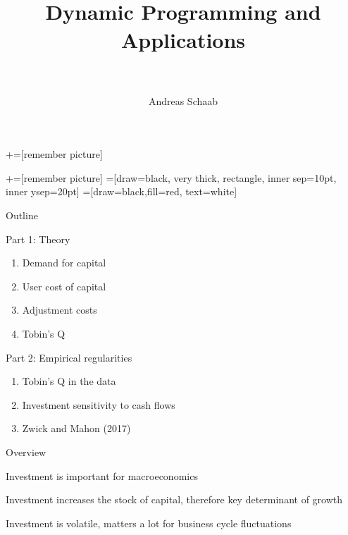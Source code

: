 \documentclass[11pt, aspectratio=169]{beamer}
\title[]{\\[8pt]
	{\large \color{blue} Dynamic Programming and Applications \\[5pt] \normalfont{Investment} \\[10pt] \normalfont{Lecture 9}}}
\author[Schaab]{Andreas Schaab}
\institute{}
\date{}
\newenvironment{witemize}{\itemize\addtolength{\itemsep}{10pt}}{\enditemize}
\begin{document}
+=[remember picture]

\newcommand\marktopleft[1]{%
	\tikz[overlay,remember picture] 
	\node (marker-#1-a) at (-.3em,.3em) {};%
}
\newcommand\markbottomright[2]{%
	\tikz[overlay,remember picture] 
	\node (marker-#1-b) at (0em,0em) {};%
}
+=[remember picture] 
 =[draw=black, very thick, rectangle, inner sep=10pt, inner ysep=20pt]
 =[draw=black,fill=red, text=white]


\addtocounter{framenumber}{-1}
\thispagestyle{empty}
\maketitle 
\newpage




\begin{frame}{Outline}
\thispagestyle{empty}
\addtocounter{framenumber}{-1}

Part 1: Theory
\begin{enumerate}
\item Demand for capital

\item User cost of capital

\item Adjustment costs

\item Tobin's Q
\end{enumerate}

\vspace{5mm}
Part 2: Empirical regularities 
\begin{enumerate}
\item Tobin's Q in the data
\item Investment sensitivity to cash flows
\item Zwick and Mahon (2017)
\end{enumerate}

\end{frame}


\begin{frame}{Overview}
\begin{witemize}
\item Investment is important for macroeconomics

\item Investment increases the stock of capital, therefore key determinant of growth

\item Investment is volatile, matters a lot for business cycle fluctuations

\end{witemize}
\end{frame}
\end{document}
